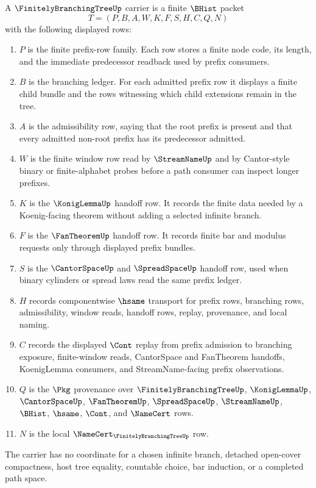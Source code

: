 \begin{definition}
\label{def:finitely-branching-tree-carrier}
A $\FinitelyBranchingTreeUp$ carrier is a finite $\BHist$ packet
$$
T=(P,B,A,W,K,F,S,H,C,Q,N)
$$
with the following displayed rows:
\begin{enumerate}
\item $P$ is the finite prefix-row family. Each row stores a finite node code, its length, and the immediate predecessor readback used by prefix consumers.
\item $B$ is the branching ledger. For each admitted prefix row it displays a finite child bundle and the rows witnessing which child extensions remain in the tree.
\item $A$ is the admissibility row, saying that the root prefix is present and that every admitted non-root prefix has its predecessor admitted.
\item $W$ is the finite window row read by $\StreamNameUp$ and by Cantor-style binary or finite-alphabet probes before a path consumer can inspect longer prefixes.
\item $K$ is the $\KonigLemmaUp$ handoff row. It records the finite data needed by a Koenig-facing theorem without adding a selected infinite branch.
\item $F$ is the $\FanTheoremUp$ handoff row. It records finite bar and modulus requests only through displayed prefix bundles.
\item $S$ is the $\CantorSpaceUp$ and $\SpreadSpaceUp$ handoff row, used when binary cylinders or spread laws read the same prefix ledger.
\item $H$ records componentwise $\hsame$ transport for prefix rows, branching rows, admissibility, window reads, handoff rows, replay, provenance, and local naming.
\item $C$ records the displayed $\Cont$ replay from prefix admission to branching exposure, finite-window reads, CantorSpace and FanTheorem handoffs, KoenigLemma consumers, and StreamName-facing prefix observations.
\item $Q$ is the $\Pkg$ provenance over $\FinitelyBranchingTreeUp$, $\KonigLemmaUp$, $\CantorSpaceUp$, $\FanTheoremUp$, $\SpreadSpaceUp$, $\StreamNameUp$, $\BHist$, $\hsame$, $\Cont$, and $\NameCert$ rows.
\item $N$ is the local $\NameCert_{\FinitelyBranchingTreeUp}$ row.
\end{enumerate}
The carrier has no coordinate for a chosen infinite branch, detached open-cover compactness, host tree equality, countable choice, bar induction, or a completed path space.
\end{definition}

